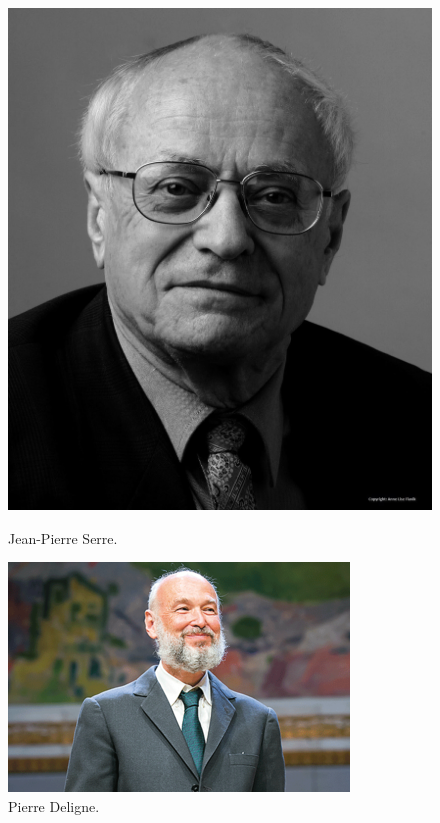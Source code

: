 \documentclass [11 pt, oneside] {article}
\begin{document}

\begin{figure}
	\begin{center}
		\includegraphics [scale = 0.19] {images/serre}
		\caption {Jean-Pierre Serre.}
	\end{center}
	\begin{center}
		\includegraphics [scale = 0.1] {images/deligne}
		\caption {Pierre Deligne.}
	\end{center}
\end{figure}
\end{document}
